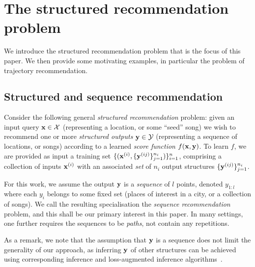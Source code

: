 
\section{The structured recommendation problem}
\label{sec:recseq}

We introduce the structured recommendation problem that is the focus of this paper.
We then provide some motivating examples, in particular the problem of trajectory recommendation.

\subsection{Structured and sequence recommendation}
\label{sec:seqrec-defn}

Consider the following general %
\emph{structured recommendation} problem:
given an input query $\mathbf{x} \in \mathcal{X}$ (representing \eg a location, or some ``seed'' song)
we wish to recommend one or more \emph{structured outputs} $\mathbf{y} \in \mathcal{Y}$ (representing \eg a sequence of locations, or songs)
according to a learned \emph{score function} $f(\mathbf{x},\mathbf{y})$.
To learn $f$,
we are provided as input a training set
$\{ ( \mathbf{x}^{({i})}, \{ \mathbf{y}^{({ij})} \}_{j=1}^{n_i} ) \}_{i=1}^{n}$,
comprising a collection of inputs $\mathbf{x}^{({i})}$ with an associated \emph{set} of $n_i$ output structures $\{ \mathbf{y}^{({ij})} \}_{j=1}^{n_i}$.

For this work, we assume the output $\mathbf{y}$ is a \emph{sequence} of $l$ points, denoted $y_{1:l}$
where each $y_i$ belongs to some fixed set (\eg places of interest in a city, or a collection of songs).
We call the resulting specialisation the \emph{sequence recommendation} problem,
and this shall be our primary interest in this paper.
In many settings, one further requires the sequences to be \emph{paths}, \ie not contain any repetitions.

As a remark, we note that the assumption that $\mathbf{y}$ is a sequence does not limit the generality of our approach,
as inferring $\mathbf{y}$ of other structures can be achieved using corresponding inference and loss-augmented inference algorithms~\cite{joachims2009predicting}.  %



